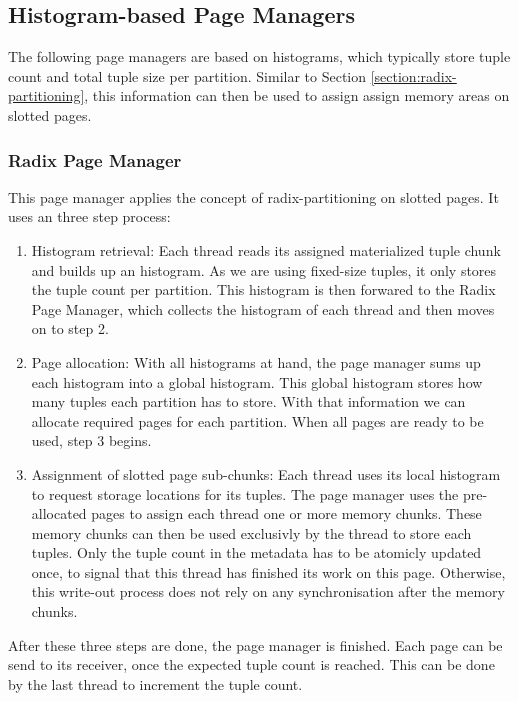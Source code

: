\subsection{Histogram-based Page Managers}
The following page managers are based on histograms, which typically store tuple count and total tuple size per partition.
Similar to Section \ref{section:radix-partitioning}, this information can then be used to assign assign memory areas on slotted pages.
\subsubsection{Radix Page Manager} \label{subsubsection-Radix-Page-Manager}
This page manager applies the concept of radix-partitioning on slotted pages.
It uses an three step process:
\begin{enumerate}
  \item Histogram retrieval: Each thread reads its assigned materialized tuple chunk and builds up an histogram.
        As we are using fixed-size tuples, it only stores the tuple count per partition.
        This histogram is then forwared to the Radix Page Manager, which collects the histogram of each thread and then moves on to step 2.

  \item Page allocation: With all histograms at hand, the page manager sums up each histogram into a global histogram.
        This global histogram stores how many tuples each partition has to store.
        With that information we can allocate required pages for each partition.
        When all pages are ready to be used, step 3 begins.

  \item Assignment of slotted page sub-chunks: Each thread uses its local histogram to request storage locations for its tuples.
        The page manager uses the pre-allocated pages to assign each thread one or more memory chunks.
        These memory chunks can then be used exclusivly by the thread to store each tuples.
        Only the tuple count in the metadata has to be atomicly updated once, to signal that this thread has finished its work on this page.
        Otherwise, this write-out process does not rely on any synchronisation after the memory chunks.
\end{enumerate}
After these three steps are done, the page manager is finished.
Each page can be send to its receiver, once the expected tuple count is reached.
This can be done by the last thread to increment the tuple count.

